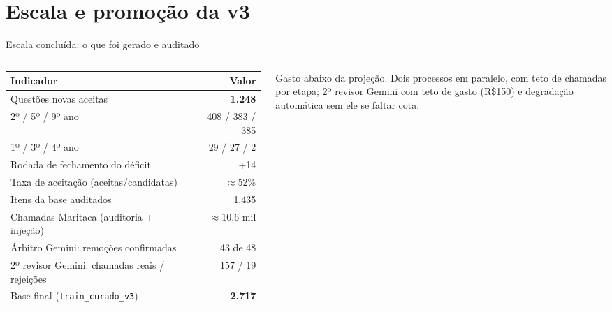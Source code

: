 \documentclass[aspectratio=169,11pt]{beamer}
\begin{document}
\section{Escala e promoção da v3}
\begin{frame}{Escala concluída: o que foi gerado e auditado}
  \begin{columns}[T]
    \footnotesize
    \begin{tabularx}{\textwidth}{@{}X r@{}}
      \toprule
      \textbf{Indicador} & \textbf{Valor} \\
      \midrule
      Questões novas aceitas                              & \textbf{1.248} \\
      \quad 2º / 5º / 9º ano                              & 408 / 383 / 385 \\
      \quad 1º / 3º / 4º ano                              & 29 / 27 / 2 \\
      \quad Rodada de fechamento do déficit                & +14 \\
      Taxa de aceitação (aceitas/candidatas)              & $\approx$52\% \\
      Itens da base auditados                             & 1.435 \\
      Chamadas Maritaca (auditoria + injeção)             & $\approx$10,6 mil \\
      Árbitro Gemini: remoções confirmadas                & 43 de 48 \\
      2º revisor Gemini: chamadas reais / rejeições        & 157 / 19 \\
      Base final (\texttt{train\_curado\_v3})             & \textbf{2.717} \\
      \bottomrule
    \end{tabularx}

    \vspace{3pt}
    {\scriptsize Gasto abaixo da projeção. Dois processos em paralelo, com teto de chamadas por etapa; 2º revisor Gemini com teto de gasto (R\$150) e degradação automática sem ele se faltar cota.}

  \end{columns}
\end{frame}
\end{document}
